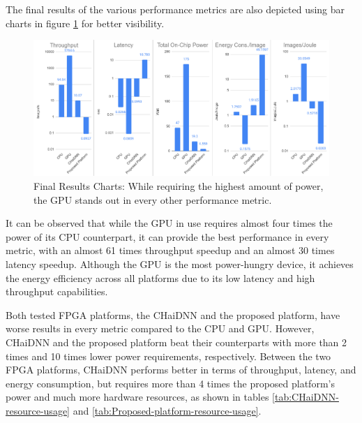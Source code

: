 The final results of the various performance metrics are also depicted using bar charts in figure \ref{fig:Final-Results-charts} for better visibility.

\begin{figure} [H]
	\centering
	\includegraphics[width=\textwidth]{../Images/Results/Final-Results-charts.png}
	\decoRule
	\caption[Final Results Charts]{Final Results Charts: While requiring the highest amount of power, the GPU stands out in every other performance metric.}
	\label{fig:Final-Results-charts}
\end{figure}

It can be observed that while the GPU in use requires almost four times the power of its CPU counterpart, it can provide the best performance in every metric, with an almost 61 times throughput speedup and an almost 30 times latency speedup. Although the GPU is the most power-hungry device, it achieves the energy efficiency across all platforms due to its low latency and high throughput capabilities.

Both tested FPGA platforms, the CHaiDNN and the proposed platform, have worse results in every metric compared to the CPU and GPU. However, CHaiDNN and the proposed platform beat their counterparts with more than 2 times and 10 times lower power requirements, respectively. Between the two FPGA platforms, CHaiDNN performs better in terms of throughput, latency, and energy consumption, but requires more than 4 times the proposed platform's power and much more hardware resources, as shown in tables \ref{tab:CHaiDNN-resource-usage} and \ref{tab:Proposed-platform-resource-usage}.

